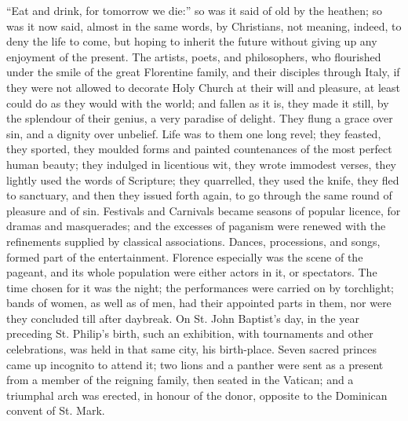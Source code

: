 ``Eat and drink, for tomorrow we die:'' so was
it said of old by the heathen; so was it now said, almost
in the same words, by Christians, not meaning, indeed, to
deny the life to come, but hoping to inherit the future
without giving up any enjoyment of the present. The
artists, poets, and philosophers, who flourished under
the smile of the great Florentine family, and their
disciples through Italy, if they were not allowed to
decorate Holy Church at their will and pleasure, at least
could do as they would with the world; and fallen as it
is, they made it still, by the splendour of their genius,
a very paradise of delight. They flung a grace over sin,
and a dignity over unbelief. Life was to them one long
revel; they feasted, they sported, they moulded forms and
painted countenances of the most perfect human beauty;
they indulged in licentious wit, they wrote immodest
verses, they lightly used the words of Scripture; they
quarrelled, they used the knife, they fled to sanctuary,
and then they issued forth again, to go through the same
round of pleasure and of sin. Festivals and Carnivals
became seasons of popular licence, for dramas and
masquerades; and the excesses of paganism were renewed with the refinements supplied by classical associations.
Dances, processions, and songs, formed part of the
entertainment. Florence especially was the scene of the
pageant, and its whole population were either actors in
it, or spectators. The time chosen for it was the night;
the performances were carried on by torchlight; bands of
women, as well as of men, had their appointed parts in
them, nor were they concluded till after daybreak. On St.
John Baptist's day, in the year preceding St. Philip's
birth, such an exhibition, with tournaments and other
celebrations, was held in that same city, his
birth-place. Seven sacred princes came up incognito to
attend it; two lions and a panther were sent as a present
from a member of the reigning family, then seated in the
Vatican; and a triumphal arch was erected, in honour of
the donor, opposite to the Dominican convent of St. Mark.

